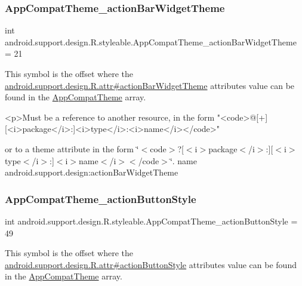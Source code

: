 \subsubsection{\texorpdfstring{App\+Compat\+Theme\+\_\+action\+Bar\+Widget\+Theme}{AppCompatTheme\_actionBarWidgetTheme}}
{\footnotesize\ttfamily int android.\+support.\+design.\+R.\+styleable.\+App\+Compat\+Theme\+\_\+action\+Bar\+Widget\+Theme = 21\hspace{0.3cm}{\ttfamily [static]}}

This symbol is the offset where the \hyperlink{classandroid_1_1support_1_1design_1_1R_1_1attr_a6cb38d746e53af08824c992a2ee02166}{android.\+support.\+design.\+R.\+attr\#action\+Bar\+Widget\+Theme} attribute\textquotesingle{}s value can be found in the \hyperlink{classandroid_1_1support_1_1design_1_1R_1_1styleable_afb351dc8de20cbd4c89abe360373010c}{App\+Compat\+Theme} array.

\begin{DoxyVerb}      <p>Must be a reference to another resource, in the form "<code>@[+][<i>package</i>:]<i>type</i>:<i>name</i></code>"
\end{DoxyVerb}
 or to a theme attribute in the form \char`\"{}$<$code$>$?\mbox{[}$<$i$>$package$<$/i$>$\+:\mbox{]}\mbox{[}$<$i$>$type$<$/i$>$\+:\mbox{]}$<$i$>$name$<$/i$>$$<$/code$>$\char`\"{}.  name android.\+support.\+design\+:action\+Bar\+Widget\+Theme \mbox{\label{classandroid_1_1support_1_1design_1_1R_1_1styleable_a7624e37d8aabda6278719ae78bd6ceac}} 
\subsubsection{\texorpdfstring{App\+Compat\+Theme\+\_\+action\+Button\+Style}{AppCompatTheme\_actionButtonStyle}}
{\footnotesize\ttfamily int android.\+support.\+design.\+R.\+styleable.\+App\+Compat\+Theme\+\_\+action\+Button\+Style = 49\hspace{0.3cm}{\ttfamily [static]}}

This symbol is the offset where the \hyperlink{classandroid_1_1support_1_1design_1_1R_1_1attr_a6964dc5822bfe14e17b180380fe43d25}{android.\+support.\+design.\+R.\+attr\#action\+Button\+Style} attribute\textquotesingle{}s value can be found in the \hyperlink{classandroid_1_1support_1_1design_1_1R_1_1styleable_afb351dc8de20cbd4c89abe360373010c}{App\+Compat\+Theme} array.

